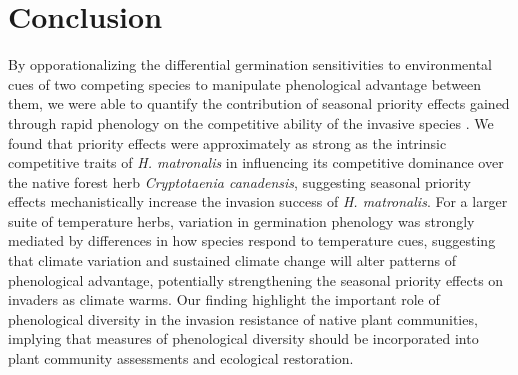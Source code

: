 \documentclass{article}[11pt]
\begin{document}
\section*{Conclusion}
By opporationalizing the differential germination sensitivities to environmental cues of two competing species to manipulate phenological advantage between them, we were able to quantify the contribution of seasonal priority effects gained through rapid phenology on the competitive ability of the invasive species . We found that priority effects were approximately as strong as the intrinsic competitive traits of \textit{H. matronalis} in influencing its competitive dominance over the native forest herb \textit{Cryptotaenia canadensis}, suggesting seasonal priority effects mechanistically increase the invasion success of \textit{H. matronalis}. For a larger suite of temperature herbs, variation in germination phenology was strongly mediated by differences in how species respond to temperature cues, suggesting that climate variation and sustained climate change will alter patterns of phenological advantage, potentially strengthening the seasonal priority effects on invaders as climate warms. Our finding highlight the important role of phenological diversity in the invasion resistance of native plant communities, implying that measures of phenological diversity should be incorporated into plant community assessments and ecological restoration. 




\end{document}
